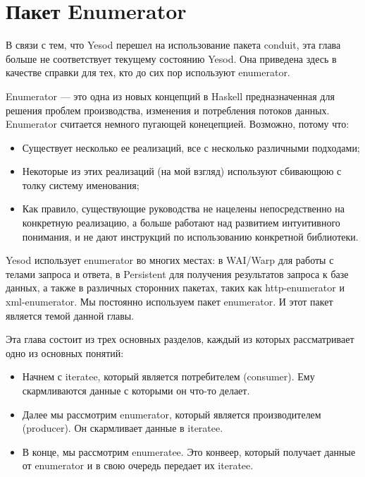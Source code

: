 \chapter{Пакет Enumerator}\label{chap:enumerator}


\begin{remark}
В связи с тем, что Yesod перешел на использование пакета conduit, эта глава больше не соответствует текущему состоянию Yesod. Она приведена здесь в качестве справки для тех, кто до сих пор используют enumerator.
\end{remark}

Enumerator --- это одна из новых концепций в Haskell предназначенная для решения проблем производства, изменения и потребления потоков данных. Enumerator считается немного пугающей конецепцией. Возможно, потому что:

\begin{itemize}
\item Существует несколько ее реализаций, все с несколько различными подходами;
\item Некоторые из этих реализаций (на мой взгляд) используют сбивающюю с толку систему именования;
\item Как правило, существующие руководства не нацелены непосредственно на конкретную реализацию, а больше работают над развитием интуитивного понимания, и не дают инструкций по использованию конкретной библиотеки.
\end{itemize}

Yesod использует enumerator во многих местах: в WAI/Warp для работы с телами запроса и ответа, в Persistent для получения результатов запроса к базе данных, а также в различных сторонних пакетах, таких как http-enumerator и xml-enumerator. Мы постоянно используем пакет enumerator. И этот пакет является темой данной главы.

Эта глава состоит из трех основных разделов, каждый из которых рассматривает одно из основных понятий:

\begin{itemize}
\item Начнем с iteratee, который является потребителем (consumer). Ему скармливаются данные с которыми он что-то делает.
\item Далее мы рассмотрим enumerator, который является производителем (producer). Он скармливает данные в iteratee.
\item В конце, мы рассмотрим enumeratee. Это конвеер, который получает данные от enumerator и в свою очередь передает их iteratee.
\end{itemize}

